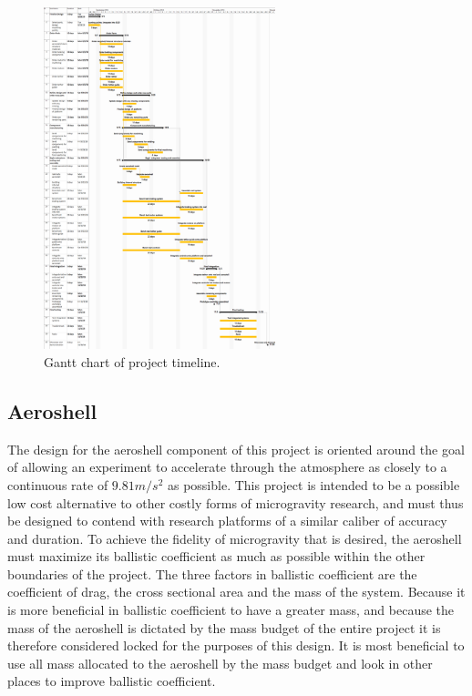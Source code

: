 \begin{figure}[H]
  \centering
  \includegraphics[width=0.6\textwidth]{TUMBR/ProjectTimeline.png}
  \caption{\label{fig:ProjectTimeline}Gantt chart of project timeline.}
\end{figure}


\subsection{Aeroshell}

\indent\indent The design for the aeroshell component of this project is oriented around the goal of allowing an experiment to accelerate through the atmosphere as closely to a continuous rate of $9.81 m/s^2$ as possible. This project is intended to be a possible low cost alternative to other costly forms of microgravity research, and must thus be designed to contend with research platforms of a similar caliber of accuracy and duration. To achieve the fidelity of microgravity that is desired, the aeroshell must maximize its ballistic coefficient as much as possible within the other boundaries of the project. The three factors in ballistic coefficient are the coefficient of drag, the cross sectional area and the mass of the system. Because it is more beneficial in ballistic coefficient to have a greater mass, and because the mass of the aeroshell is dictated by the mass budget of the entire project it is therefore considered locked for the purposes of this design. It is most beneficial to use all mass allocated to the aeroshell by the mass budget and look in other places to improve ballistic coefficient. 

